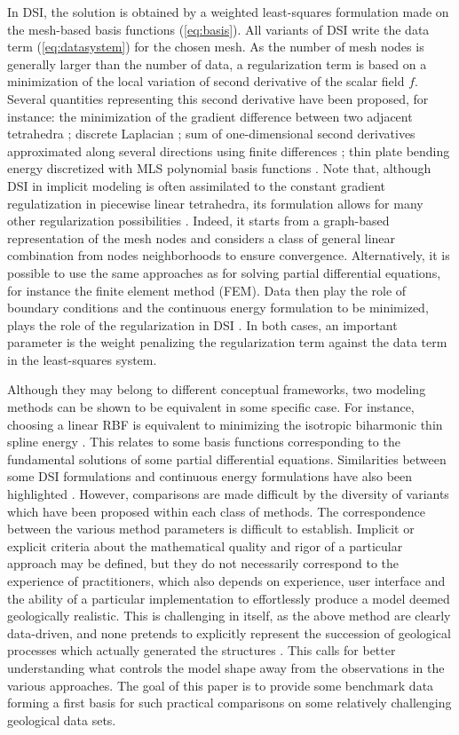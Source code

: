 \documentclass[final]{ring20}
\begin{document}
{In DSI, the solution is obtained by a weighted least-squares formulation made on the mesh-based basis functions (\ref{eq:basis}). All variants of DSI write the data term (\ref{eq:datasystem}) for the chosen mesh. As the number of mesh nodes is generally larger than the number of data, a regularization term is based on a minimization of the local variation of second derivative of the scalar field $f$. Several quantities representing this second derivative have been proposed, for instance: the minimization of the gradient difference between two adjacent tetrahedra \citep{Frank2007CG}; discrete Laplacian \citep{Irakarama2018EAGE}; sum of one-dimensional second derivatives approximated along several directions using finite differences \citep{Irakarama2018EAGE}; thin plate bending energy discretized with MLS polynomial basis functions \citep{Renaudeau2019MG}. Note that, although DSI in implicit modeling is often assimilated to the constant gradient regulatization in piecewise linear tetrahedra, its formulation allows for many other regularization possibilities \citep{Mallet1992CD}. Indeed, it starts from a graph-based representation of the mesh nodes and considers a class of general linear combination from nodes neighborhoods to ensure convergence. Alternatively, it is possible to use the same approaches as for solving partial differential equations, for instance the finite element method (FEM). Data then play the role of boundary conditions and the continuous energy formulation to be minimized, plays the role of the regularization in DSI \citep{Renaudeau2019MG}. In both cases, an important parameter is the weight penalizing the regularization term against the data term in the least-squares system. 

Although they may belong to different conceptual frameworks, two modeling methods can be shown to be equivalent in some specific case. For instance, choosing a linear RBF is equivalent to minimizing the isotropic biharmonic thin spline energy \citep{Carr2001}. This relates to some basis functions corresponding to the fundamental solutions of some partial differential equations. Similarities between some DSI formulations and continuous energy formulations have also been highlighted \citep{Renaudeau2019MG}. However, comparisons are made difficult by the diversity of variants which have been proposed within each class of methods. The correspondence between the various method parameters is difficult to establish. Implicit or explicit criteria about the mathematical quality and rigor of a particular approach may be defined, but they do not necessarily correspond to the experience of practitioners, which also depends on experience, user interface and the ability of a particular implementation to effortlessly produce a model deemed geologically realistic. This is challenging in itself, as the above method are clearly data-driven, and none pretends to explicitly represent the succession of geological processes which actually generated the structures \citep{Caumon2010MG,Jessell2010T}. This calls for better understanding what controls the model shape away from the observations in the various approaches. The goal of this paper is to provide some benchmark data forming a first basis for such practical comparisons on some relatively challenging geological data sets. 

}
\end{document}
